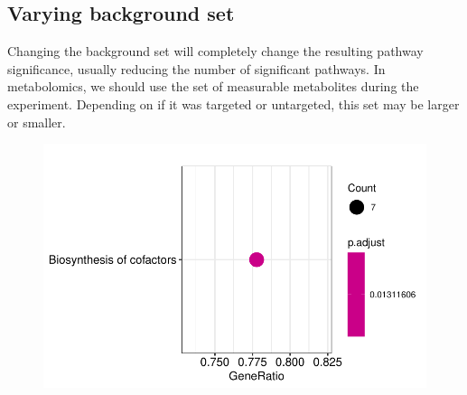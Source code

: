 \documentclass[
  24px,
  letterpaper,
  DIV=11,
  numbers=noendperiod]{scrartcl}
\newenvironment{Shaded}{\begin{snugshade}}{\end{snugshade}}
\newcommand{\AttributeTok}[1]{\textcolor[rgb]{0.40,0.45,0.13}{#1}}
\newcommand{\CommentTok}[1]{\textcolor[rgb]{0.37,0.37,0.37}{#1}}
\newcommand{\FunctionTok}[1]{\textcolor[rgb]{0.28,0.35,0.67}{#1}}
\newcommand{\NormalTok}[1]{\textcolor[rgb]{0.00,0.23,0.31}{#1}}
\newcommand{\OtherTok}[1]{\textcolor[rgb]{0.00,0.23,0.31}{#1}}
\newcommand{\SpecialCharTok}[1]{\textcolor[rgb]{0.37,0.37,0.37}{#1}}
\begin{document}
\hypertarget{varying-background-set}{%
\subsection{Varying background set}\label{varying-background-set}}

Changing the background set will completely change the resulting pathway
significance, usually reducing the number of significant pathways. In
metabolomics, we should use the set of measurable metabolites during the
experiment. Depending on if it was targeted or untargeted, this set may
be larger or smaller.

\begin{Shaded}
\end{Shaded}

\begin{figure}[H]

{\centering \includegraphics{index_files/figure-pdf/unnamed-chunk-16-1.pdf}

}

\end{figure}
\end{document}
